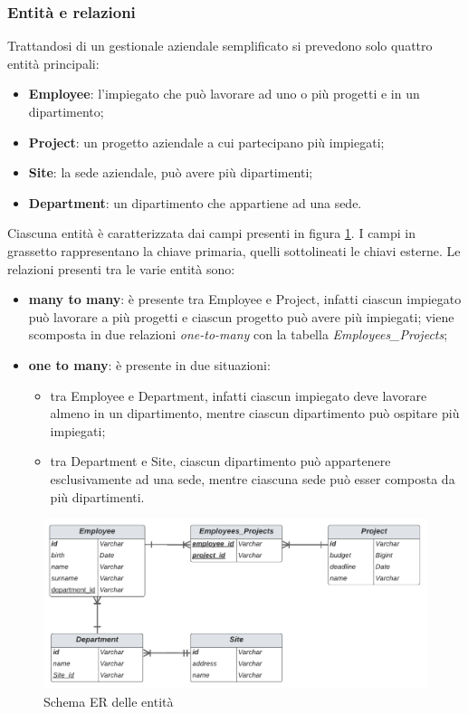\subsubsection*{Entità e relazioni}
\label{entity-relation}
Trattandosi di un gestionale aziendale semplificato si prevedono solo quattro entità principali:
\begin{itemize}
  \item \textbf{Employee}: l'impiegato che può lavorare ad uno o più progetti e in un dipartimento;
  \item \textbf{Project}: un progetto aziendale a cui partecipano più impiegati;
  \item \textbf{Site}: la sede aziendale, può avere più dipartimenti;
  \item \textbf{Department}: un dipartimento che appartiene ad una sede.
\end{itemize}
Ciascuna entità è caratterizzata dai campi presenti in figura \ref{ER-prototype}. I campi in grassetto rappresentano la chiave primaria, quelli sottolineati le chiavi esterne. Le relazioni presenti tra le varie entità sono:
\begin{itemize}
  \item \textbf{many to many}: è presente tra Employee e Project, infatti ciascun impiegato può lavorare a più progetti e ciascun progetto può avere più impiegati; viene scomposta in due relazioni \textit{one-to-many} con la tabella \textit{Employees\_Projects};
  \item \textbf{one to many}: è presente in due situazioni:
  \begin{itemize}
    \item tra Employee e Department, infatti ciascun impiegato deve lavorare almeno in un dipartimento, mentre ciascun dipartimento può ospitare più impiegati;
    \item tra Department e Site, ciascun dipartimento può appartenere esclusivamente ad una sede, mentre ciascuna sede può esser composta da più dipartimenti.
  \end{itemize}
\end{itemize}
\FloatBarrier
\begin{figure}[!ht]
\centering
\includegraphics[width=1\linewidth]{immagini/ER_prototype.pdf}
\caption{Schema ER delle entità}
\label{ER-prototype}
\end{figure}
\FloatBarrier
